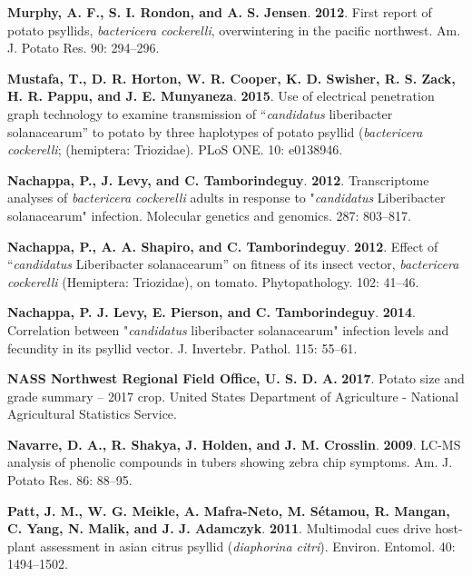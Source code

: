 \documentclass[]{article}
\begin{document}
\leavevmode\hypertarget{ref-Murphy2012}{}%
\textbf{Murphy, A. F., S. I. Rondon, and A. S. Jensen}. \textbf{2012}.
First report of potato psyllids, \emph{bactericera cockerelli},
overwintering in the pacific northwest. Am. J. Potato Res. 90: 294--296.

\leavevmode\hypertarget{ref-Mustafa2015b}{}%
\textbf{Mustafa, T., D. R. Horton, W. R. Cooper, K. D. Swisher, R. S.
Zack, H. R. Pappu, and J. E. Munyaneza}. \textbf{2015}. Use of
electrical penetration graph technology to examine transmission of
``\emph{candidatus} liberibacter solanacearum'' to potato by three
haplotypes of potato psyllid (\emph{bactericera cockerelli}; (hemiptera:
Triozidae). PLoS ONE. 10: e0138946.

\leavevmode\hypertarget{ref-Nachappa2012a}{}%
\textbf{Nachappa, P., J. Levy, and C. Tamborindeguy}. \textbf{2012}.
Transcriptome analyses of \emph{bactericera cockerelli} adults in
response to "\emph{candidatus} Liberibacter solanacearum" infection.
Molecular genetics and genomics. 287: 803--817.

\leavevmode\hypertarget{ref-Nachappa2012}{}%
\textbf{Nachappa, P., A. A. Shapiro, and C. Tamborindeguy}.
\textbf{2012}. Effect of ``\emph{candidatus} Liberibacter solanacearum''
on fitness of its insect vector, \emph{bactericera cockerelli}
(Hemiptera: Triozidae), on tomato. Phytopathology. 102: 41--46.

\leavevmode\hypertarget{ref-Nachappa2014}{}%
\textbf{Nachappa, P. J. Levy, E. Pierson, and C. Tamborindeguy}.
\textbf{2014}. Correlation between "\emph{candidatus} liberibacter
solanacearum" infection levels and fecundity in its psyllid vector. J.
Invertebr. Pathol. 115: 55--61.

\leavevmode\hypertarget{ref-NASSNorthwestRegionalFieldOffice2017}{}%
\textbf{NASS Northwest Regional Field Office, U. S. D. A.}
\textbf{2017}. Potato size and grade summary -- 2017 crop. United States
Department of Agriculture - National Agricultural Statistics Service.

\leavevmode\hypertarget{ref-Navarre2009}{}%
\textbf{Navarre, D. A., R. Shakya, J. Holden, and J. M. Crosslin}.
\textbf{2009}. LC-MS analysis of phenolic compounds in tubers showing
zebra chip symptoms. Am. J. Potato Res. 86: 88--95.

\leavevmode\hypertarget{ref-Patt2011}{}%
\textbf{Patt, J. M., W. G. Meikle, A. Mafra-Neto, M. Sétamou, R. Mangan,
C. Yang, N. Malik, and J. J. Adamczyk}. \textbf{2011}. Multimodal cues
drive host-plant assessment in asian citrus psyllid (\emph{diaphorina
citri}). Environ. Entomol. 40: 1494--1502.
\end{document}
